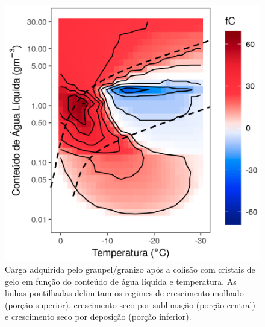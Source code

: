 \begin{figure}[htb]
	\begin{center}
		\caption{Carga adquirida pelo graupel/granizo após a colisão com cristais de gelo em função do conteúdo de água líquida e temperatura. As linhas pontilhadas delimitam os regimes de crescimento molhado (porção superior), crescimento seco por sublimação (porção central) e crescimento seco por deposição (porção inferior).} 
		\label{takahashi}
		\includegraphics[width=0.6\columnwidth]{figs/takahashi_williams_ptbr.png}
	\end{center}
\end{figure}


